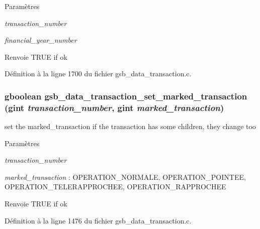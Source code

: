 \begin{DoxyParams}{Paramètres}
\item[{\em transaction\_\-number}]\item[{\em financial\_\-year\_\-number}]\end{DoxyParams}
\begin{DoxyReturn}{Renvoie}
TRUE if ok 
\end{DoxyReturn}


Définition à la ligne 1700 du fichier gsb\_\-data\_\-transaction.c.

\subsubsection[{gsb\_\-data\_\-transaction\_\-set\_\-marked\_\-transaction}]{\setlength{\rightskip}{0pt plus 5cm}gboolean gsb\_\-data\_\-transaction\_\-set\_\-marked\_\-transaction (gint {\em transaction\_\-number}, \/  gint {\em marked\_\-transaction})}\label{gsb__data__transaction_8c_ad6f2f1403737959c3aee7059b7115399}
set the marked\_\-transaction if the transaction has some children, they change too


\begin{DoxyParams}{Paramètres}
\item[{\em transaction\_\-number}]\item[{\em marked\_\-transaction}]: OPERATION\_\-NORMALE, OPERATION\_\-POINTEE, OPERATION\_\-TELERAPPROCHEE, OPERATION\_\-RAPPROCHEE\end{DoxyParams}
\begin{DoxyReturn}{Renvoie}
TRUE if ok 
\end{DoxyReturn}


Définition à la ligne 1476 du fichier gsb\_\-data\_\-transaction.c.

